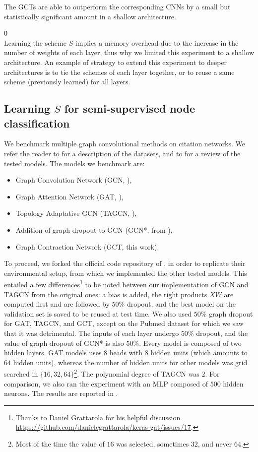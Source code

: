 The GCTs are able to outperform the corresponding CNNs by a small but statistically significant amount in a shallow architecture.

\h{0}\\

Learning the scheme $S$ implies a memory overhead due to the increase in the number of weights of each layer, thus why we limited this experiment to a shallow architecture. An example of strategy to extend this experiment to deeper architectures is to tie the schemes of each layer together, or to reuse a same scheme (previously learned) for all layers.


\subsection{Learning $S$ for semi-supervised node classification}
\label{sec:lss}

We benchmark multiple graph convolutional methods on citation networks. We refer the reader to  for a description of the datasets, and to  for a review of the tested models. The models we benchmark are:
\begin{itemize}[nolistsep,noitemsep]
 \item Graph Convolution Network (GCN, \cite{kipf2016semi}),
 \item Graph Attention Network (GAT, \cite{velickovic2017graph}),
 \item Topology Adaptative GCN (TAGCN,  \cite{du2017topology}),
 \item Addition of graph dropout to GCN (GCN*, from ),
 \item Graph Contraction Network (GCT, this work).
\end{itemize}

To proceed, we forked the official code repository of \cite{velickovic2017graph}, in order to replicate their environmental setup, from which we implemented the other tested models. This entailed a few differences\footnote{Thanks to Daniel Grattarola for his helpful discussion \url{https://github.com/danielegrattarola/keras-gat/issues/17}.} to be noted between our implementation of GCN and TAGCN from the original ones: a bias is added, the right products $XW$ are computed first and are followed by $50\%$ dropout, and the best model on the validation set is saved to be reused at test time. We also used $50\%$ graph dropout for GAT, TAGCN, and GCT, except on the Pubmed dataset for which we saw that it was detrimental. The inputs of each layer undergo $50\%$ dropout, and the value of graph dropout of GCN* is also $50\%$. Every model is composed of two hidden layers. GAT models uses $8$ heads with $8$ hidden units (which amounts to $64$ hidden units), whereas the number of hidden units for other models was grid searched in $\{16, 32, 64\}$\footnote{Most of the time the value of $16$ was selected, sometimes $32$, and never $64$.}. The polynomial degree of TAGCN was $2$. For comparison, we also ran the experiment with an MLP composed of $500$ hidden neurons. The results are reported in .

